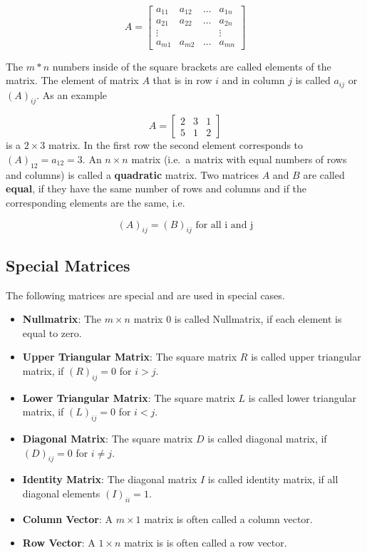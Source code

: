 \documentclass[
]{book}
\providecommand{\tightlist}{%
  \setlength{\itemsep}{0pt}\setlength{\parskip}{0pt}}
\theoremstyle{definition}
\theoremstyle{definition}
\theoremstyle{definition}
\theoremstyle{remark}
\begin{document}
\[
A = \left[
\begin{array}{cccc}
a_{11}  &  a_{12} &  \ldots  &  a_{1n} \\
a_{21}  &  a_{22} &  \ldots  &  a_{2n} \\
\vdots  &         &          &  \vdots \\
a_{m1}  &  a_{m2} &  \ldots  &  a_{mn}
\end{array}
\right]
\]

The \(m*n\) numbers inside of the square brackets are called elements of the matrix. The element of matrix \(A\) that is in row \(i\) and in column \(j\) is called \(a_{ij}\) or \((A)_{ij}\). As an example

\[
A =  \left[
\begin{array}{ccc}
2  &  3  &  1  \\
5  &  1  &  2
\end{array}
\right]
\]
is a \(2 \times 3\) matrix. In the first row the second element corresponds to \((A)_{12} = a_{12} = 3\). An \(n\times n\) matrix (i.e.~a matrix with equal numbers of rows and columns) is called a \textbf{quadratic} matrix. Two matrices \(A\) and \(B\) are called \textbf{equal}, if they have the same number of rows and columns and if the corresponding elements are the same, i.e.

\[
(A)_{ij} = (B)_{ij} \text{ for all i and j}
\]

\hypertarget{intro-linalg-special-matrices}{%
\subsection{Special Matrices}\label{intro-linalg-special-matrices}}

The following matrices are special and are used in special cases.

\begin{itemize}
\tightlist
\item
  \textbf{Nullmatrix}: The \(m\times n\) matrix \(0\) is called Nullmatrix, if each element is equal to zero.
\item
  \textbf{Upper Triangular Matrix}: The square matrix \(R\) is called upper triangular matrix, if \((R)_{ij} = 0\) for \(i>j\).
\item
  \textbf{Lower Triangular Matrix}: The square matrix \(L\) is called lower triangular matrix, if \((L)_{ij} = 0\) for \(i<j\).
\item
  \textbf{Diagonal Matrix}: The square matrix \(D\) is called diagonal matrix, if \((D)_{ij} = 0\) for \(i\ne j\).
\item
  \textbf{Identity Matrix}: The diagonal matrix \(I\) is called identity matrix, if all diagonal elements \((I)_{ii} = 1\).
\item
  \textbf{Column Vector}: A \(m\times 1\) matrix is often called a column vector.
\item
  \textbf{Row Vector}: A \(1\times n\) matrix is is often called a row vector.
\end{itemize}
\end{document}
